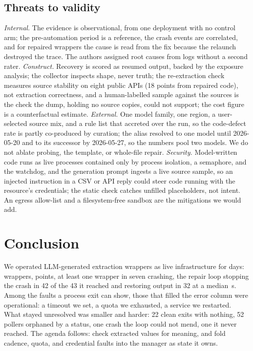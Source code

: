 \documentclass[conference]{IEEEtran}
\begin{document}
\subsection{Threats to validity}
\emph{Internal.} The evidence is observational, from one deployment with no control
arm; the pre-automation period is a reference, the crash events are correlated, and for
repaired wrappers the cause is read from the fix because the relaunch destroyed the
trace. The authors assigned root causes from logs without a second rater.
\emph{Construct.} Recovery is scored as resumed output, backed by the exposure
analysis; the collector inspects shape, never truth; the re-extraction check
measures source stability on eight public APIs (18 points from repaired code), not
extraction correctness, and a human-labelled sample against the sources is the check
the dump, holding no source copies, could not support; the cost figure is a
counterfactual estimate. \emph{External.} One model family, one region, a
user-selected source mix, and a rule list that accreted over the run, so the
code-defect rate is partly co-produced by curation; the alias resolved to one model
until 2026-05-20 and to its successor by 2026-05-27, so the numbers pool two models.
We do not ablate probing, the template, or whole-file repair. \emph{Security.}
Model-written code runs as live processes contained only by process isolation, a
semaphore, and the watchdog, and the generation prompt ingests a live source sample,
so an injected instruction in a CSV or API reply could steer code running with the
resource's credentials; the static check catches unfilled placeholders, not intent.
An egress allow-list and a filesystem-free sandbox are the mitigations we would add.

\section{Conclusion}
\label{sec:conclusion}

We operated LLM-generated extraction wrappers as live infrastructure for
\deploymentDays{} days: \nWrappers{} wrappers, \nDataPoints{} points, at least one
wrapper in seven crashing, the repair loop stopping the crash in 42 of the 43 it
reached and restoring output in 32 at a median \healLatencyMedian{}\,s. Among the faults
a process exit can show, those that filled the error column were operational: a
timeout we set, a quota we exhausted, a service we restarted. What stayed unresolved was smaller and harder: 22 clean exits
with nothing, 52 pollers orphaned by a status, one crash the loop could not mend, one
it never reached. The agenda follows: check extracted values for meaning, and fold
cadence, quota, and credential faults into the manager as state it owns.
\end{document}
